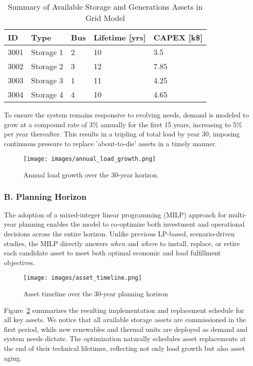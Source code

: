 \begin{table}[h]
    \centering
    \begin{tabular}{p{1.5cm} p{3.5cm} p{1.5cm} p{2.5cm} p{2.5cm}}
    \textbf{ID} & \textbf{Type} & \textbf{Bus} & \textbf{Lifetime [yrs]} & \textbf{CAPEX [k\$]} \\
    \hline
    3001 & Storage 1 & 2 & 10 & 3.5 \\
    3002 & Storage 2 & 3 & 12 & 7.85 \\
    3003 & Storage 3 & 1 & 11 & 4.25 \\
    3004 & Storage 4 & 4 & 10 & 4.65 \\
    \end{tabular}
    \caption{Summary of Available Storage and Generations Assets in Grid Model}
    \label{tab:config-storages}
\end{table}

To ensure the system remains responsive to evolving needs, demand is modeled to grow 
at a compound rate of 3\% annually for the first 15 years, increasing to 5\% per year 
thereafter. This results in a tripling of total load by year 30, imposing continuous 
pressure to replace 'about-to-die' assets in a timely manner.

\begin{figure}[h!]
    \centering
    \texttt{[image: images/annual\_load\_growth.png]}
    \caption{Annual load growth over the 30-year horizon.}
    \label{fig:annual_load_growth}
\end{figure}

\subsubsection*{B. Planning Horizon}
The adoption of a mixed-integer linear programming (MILP) approach for multi-year planning enables 
the model to co-optimize both investment and operational decisions across the entire horizon. 
Unlike previous LP-based, scenario-driven studies, the MILP directly answers \textit{when} and 
\textit{where} to install, replace, or retire each candidate asset to meet both optimal economic and 
load fulfillment objectives.

\begin{figure}[h!]
    \centering
    \texttt{[image: images/asset\_timeline.png]}
    \caption{Asset timeline over the 30-year planning horizon}
    \label{fig:asset_timeline}
\end{figure}

Figure~\ref{fig:asset_timeline} summarizes the resulting implementation and replacement schedule 
for all key assets. We notice that all available storage assets are commissioned in the first period, 
while new renewables and thermal units are deployed as demand and system needs dictate. The 
optimization naturally schedules asset replacements at the end of their technical lifetimes, 
reflecting not only load growth but also asset aging.

